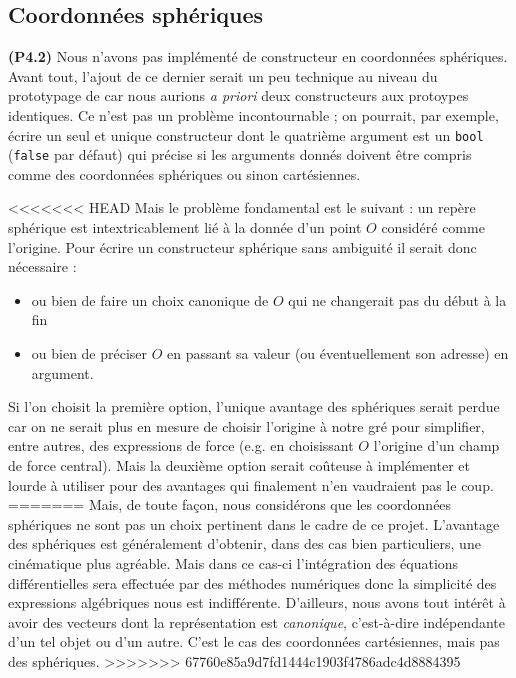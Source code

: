 \documentclass[12pt, letterpaper, twoside]{article}
\newcommand{\T}[1]{\texttt{#1}}
\begin{document}
\subsection{Coordonnées sphériques}
\noindent \textbf{(P4.2)} Nous n’avons pas implémenté de constructeur en coordonnées sphériques. Avant tout, l’ajout de ce dernier serait un peu technique au niveau du prototypage de car nous aurions \textit{a priori} deux constructeurs aux protoypes identiques. Ce n'est pas un problème incontournable ; on pourrait, par exemple, écrire un seul et unique constructeur dont le quatrième argument est un \T{bool} (\T{false} par défaut) qui précise si les arguments donnés doivent être compris comme des coordonnées sphériques ou sinon cartésiennes.

<<<<<<< HEAD
Mais le problème fondamental est le suivant : un repère sphérique est intextricablement lié à la donnée d'un point $O$ considéré comme l'origine. Pour écrire un constructeur sphérique sans ambiguité il serait donc nécessaire :
\begin{itemize}
\item ou bien de faire un choix canonique de $O$ qui ne changerait pas du début à la fin
\item ou bien de préciser $O$ en passant sa valeur (ou éventuellement son adresse) en argument.
\end{itemize}
Si l'on choisit la première option, l'unique avantage des sphériques serait perdue car on ne serait plus en mesure de choisir l'origine à notre gré pour simplifier, entre autres, des expressions de force (e.g. en choisissant $O$ l'origine d'un champ de force central). Mais la deuxième option serait coûteuse à implémenter et lourde à utiliser pour des avantages qui finalement n'en vaudraient pas le coup.
=======
Mais, de toute façon, nous considérons que les coordonnées sphériques ne sont pas un choix pertinent dans le cadre de ce projet. L'avantage des sphériques est généralement d'obtenir, dans des cas bien particuliers, une cinématique plus agréable. Mais dans ce cas-ci l'intégration des équations différentielles sera effectuée par des méthodes numériques donc la simplicité des expressions algébriques nous est indifférente. D'ailleurs, nous avons tout intérêt à avoir des vecteurs dont la représentation est \textit{canonique}, c'est-à-dire indépendante d'un tel objet ou d'un autre. C'est le cas des coordonnées cartésiennes, mais pas des sphériques.
>>>>>>> 67760e85a9d7fd1444c1903f4786adc4d8884395
\end{document}
